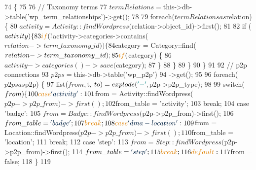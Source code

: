 \begin{DoxyCode}
74     \{  
75 
76         \textcolor{comment}{// Taxonomy terms}
77         $termRelations = $this->db->table(\textcolor{stringliteral}{'wp\_term\_relationships'})->get();
78 
79         \textcolor{keywordflow}{foreach}($termRelations as $relation) \{
80             $activity = Activity::findWordpress($relation->object\_id)->first();
81             
82             \textcolor{keywordflow}{if} ($activity) \{
83                 \textcolor{keywordflow}{if} (!$activity->categories->contains($relation->term\_taxonomy\_id)) \{
84                     $category = Category::find($relation->term\_taxonomy\_id);
85                     \textcolor{keywordflow}{if} ($category) \{
86                         $activity->categories()->save($category);
87                     \}
88                 \}
89             \}
90         \}
91 
92         \textcolor{comment}{// p2p connections}
93         $p2ps = $this->db->table(\textcolor{stringliteral}{'wp\_p2p'})
94             ->get();
95 
96         \textcolor{keywordflow}{foreach}($p2ps as $p2p) \{
97             list($from, $t, $to) = explode(\textcolor{charliteral}{'-'}, $p2p->p2p\_type);
98 
99             \textcolor{keywordflow}{switch}($from) \{
100                 \textcolor{keywordflow}{case} \textcolor{stringliteral}{'activity'}:
101                     $from = Activity::findWordpress($p2p->p2p\_from)->first();
102                     $from\_table = \textcolor{stringliteral}{'activity'};
103                     \textcolor{keywordflow}{break};
104                 \textcolor{keywordflow}{case} \textcolor{stringliteral}{'badge'}:
105                     $from = Badge::findWordpress($p2p->p2p\_from)->first();
106                     $from\_table = \textcolor{stringliteral}{'badge'};
107                     \textcolor{keywordflow}{break};
108                 \textcolor{keywordflow}{case} \textcolor{stringliteral}{'dma-location'}:
109                     $from = Location::findWordpress($p2p->p2p\_from)->first();
110                     $from\_table = \textcolor{stringliteral}{'location'};
111                     \textcolor{keywordflow}{break};
112                 \textcolor{keywordflow}{case} \textcolor{stringliteral}{'step'}:
113                     $from = Step::findWordpress($p2p->p2p\_from)->first();
114                     $from\_table = \textcolor{stringliteral}{'step'};
115                     \textcolor{keywordflow}{break};
116                 \textcolor{keywordflow}{default}:
117                     $from = \textcolor{keyword}{false};
118             \}
119 

\end{DoxyCode}
